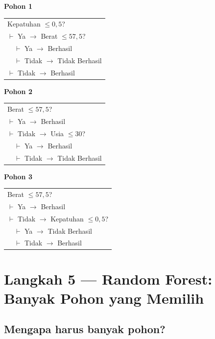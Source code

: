 \documentclass[11pt,a4paper]{article}
\begin{document}
\begin{center}
\begin{minipage}{0.31\textwidth}
\centering\small
\textbf{Pohon 1}\\[4pt]
\begin{tabular}{l}
Kepatuhan $\le 0{,}5$? \\
$\vdash$ Ya $\to$ Berat $\le 57{,}5$? \\
$\quad\vdash$ Ya $\to$ Berhasil \\
$\quad\vdash$ Tidak $\to$ Tidak Berhasil \\
$\vdash$ Tidak $\to$ Berhasil \\
\end{tabular}
\end{minipage}\hfill
\begin{minipage}{0.33\textwidth}
\centering\small
\textbf{Pohon 2}\\[4pt]
\begin{tabular}{l}
Berat $\le 57{,}5$? \\
$\vdash$ Ya $\to$ Berhasil \\
$\vdash$ Tidak $\to$ Usia $\le 30$? \\
$\quad\vdash$ Ya $\to$ Berhasil \\
$\quad\vdash$ Tidak $\to$ Tidak Berhasil \\
\end{tabular}
\end{minipage}\hfill
\begin{minipage}{0.33\textwidth}
\centering\small
\textbf{Pohon 3}\\[4pt]
\begin{tabular}{l}
Berat $\le 57{,}5$? \\
$\vdash$ Ya $\to$ Berhasil \\
$\vdash$ Tidak $\to$ Kepatuhan $\le 0{,}5$? \\
$\quad\vdash$ Ya $\to$ Tidak Berhasil \\
$\quad\vdash$ Tidak $\to$ Berhasil \\
\end{tabular}
\end{minipage}
\end{center}

\section{Langkah 5 --- Random Forest: Banyak Pohon yang Memilih}

\subsection{Mengapa harus banyak pohon?}
\end{document}

